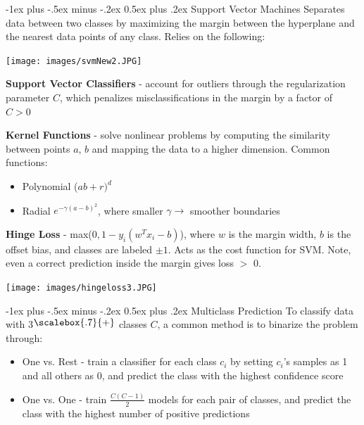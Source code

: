 \documentclass[10pt,landscape]{article}
\makeatletter
\newcommand{\plus}{\raisebox{.3\height}{\scalebox{.7}{+}}}
\renewcommand{\section}{\@startsection{section}{1}{0mm}%
                                {-1ex plus -.5ex minus -.2ex}%
                                {0.5ex plus .2ex}%
                                {\normalfont\large\bfseries}}
\renewcommand{\subsection}{\@startsection{subsection}{2}{0mm}%
                                {-1ex plus -.5ex minus -.2ex}%
                                {0.5ex plus .2ex}%
                                {\normalfont\normalsize\bfseries}}
\makeatother
\begin{document}
\begin{multicols}{3}
\section{Support Vector Machines}
Separates data between two classes by maximizing the margin between the hyperplane and the nearest data points of any class. Relies on the following:
\vspace{-2.5mm}
\begin{center}
    \texttt{[image: images/svmNew2.JPG]}
\end{center}
\vspace{-2mm}
\textbf{Support Vector Classifiers} - account for outliers through the regularization parameter $C$, which penalizes misclassifications in the margin by a factor of $C > 0$

\textbf{Kernel Functions} - solve nonlinear problems by computing the similarity between points $a$, $b$ and mapping the data to a higher dimension. Common functions:
\begin{itemize}[label={--},leftmargin=4mm]
\vspace{-1mm}
\itemsep -.4mm
\item Polynomial ($ab + r)^d$
\item Radial $e^{-\gamma(a-b)^2}$, where smaller $\gamma \to$  smoother boundaries
\end{itemize}

\textbf{Hinge Loss} - max($0,1-y_i(w^T x_i - b)$), where
$w$ is the margin width, $b$ is the offset bias, and classes are labeled $\pm1$. Acts as the cost function for SVM. Note, even a correct prediction inside the margin gives loss $>$ 0.
\vspace{-1mm}
\begin{center}
    \texttt{[image: images/hingeloss3.JPG]}
\end{center}
\vspace{-3.5mm}
\subsection{Multiclass Prediction}
To classify data with 3$\plus$ classes $C$, a common method is to binarize the problem through:
\begin{itemize}[label={--},leftmargin=4mm]
\vspace{-1mm}
\itemsep -.4mm
\item One vs. Rest - train a classifier for each class $c_i$ by setting $c_i$'s samples as 1 and all others as 0, and predict the class with the highest confidence score
\item One vs. One - train $\frac{C (C-1)}{2}$ models for each pair of classes, and predict the class with the highest number of positive predictions
\end{itemize}


\end{multicols}
\end{document}
